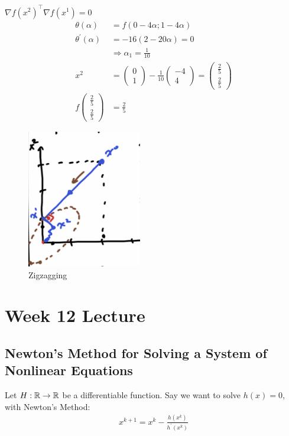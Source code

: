 \documentclass[11pt]{article}
\numberwithin{equation}{section}
\begin{document}
\begin{example}
    $\nabla f(x^2)^\top \nabla f(x^1)=0$ \begin{align*}
        \theta(\alpha) &= f(0-4\alpha;1-4\alpha) \\
        \theta^\prime (\alpha) &= -16(2-20\alpha)=0 \\
        &\Rightarrow \alpha_1 = \frac{1}{10} \\
        x^2 &= \left(\begin{array}{l}0 \\ 1\end{array}\right) - \frac{1}{10} \left(\begin{array}{l} -4 \\ 4\end{array}\right) = \left(\begin{array}{l}\frac{2}{5} \\ \frac{2}{5}\end{array}\right) \\
        f\left(\begin{array}{l}\frac{2}{5} \\ \frac{2}{5}\end{array}\right) &= \frac{2}{5}
    \end{align*}
\end{example}

\begin{figure}[H]
    \centering
    \includegraphics[width=5cm]{images/10-ex-1.png}
    \caption{Zigzagging}
\end{figure}

\newpage
\section{Week 12 Lecture}
\subsection{Newton's Method for Solving a System of Nonlinear Equations}
Let $H:\mathbb R \rightarrow \mathbb R$ be a differentiable function. Say we want to solve $h(x)=0$, with Newton's Method:\begin{align*}
    x^{k+1} = x^k - \frac{h(x^k)}{h^\prime(x^k)}
\end{align*}
\end{document}
